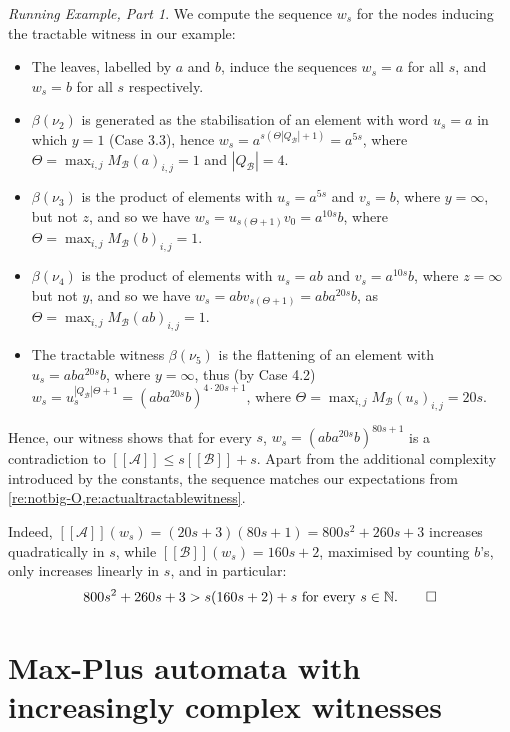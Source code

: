 \documentclass{lmcs}
\theoremstyle{remark}
\newcommand{\autA}{\mathcal{A}}
\newcommand{\autB}{\mathcal{B}}
\newcommand{\brfunc}[1]{[\![#1]\!]}
\newcommand{\funcA}{\brfunc{\autA}}
\newcommand{\funcB}{\brfunc{\autB}}
\theoremstyle{remark}
\newtheorem{runningexample/}{Running Example, Part}
\newenvironment{runningexample}
  {\renewcommand{\qedsymbol}{\color{darkgray}\ensuremath{\lrcorner}}%
   \pushQED{\qed}\begin{runningexample/}}
  {\popQED\end{runningexample/}}
\begin{document}
\begin{runningexample}
We compute the sequence $w_s$ for the nodes inducing the tractable witness in our example:
\begin{itemize}
\item The leaves, labelled by $a$ and $b$, induce the sequences $w_s = a$ for all $s$, and $w_s = b$ for all $s$ respectively.
\item $\beta(\nu_2)$ is generated as the stabilisation of an element with word $u_s = a$ in which $y = 1$ (Case 3.3), hence $w_s = a^{s(\Theta |Q_\autB| + 1)} = a^{5s}$, where $\Theta =\max_{i,j} M_\autB(a)_{i,j} = 1$ and $|Q_\autB| = 4$.
\item $\beta(\nu_3)$ is the product of elements with $u_s = a^{5s}$ and $v_s = b$, where $y= \infty$, but not $z$, and so we have $w_s = u_{s(\Theta+1)}v_0 = a^{10s}b $, where $\Theta  =\max_{i,j} M_\autB(b)_{i,j} = 1$.
\item $\beta(\nu_4)$ is the product of elements with $u_s = ab$ and $v_s = a^{10s}b$, where $z= \infty$ but not $y$, and so we have $w_s = ab v_{s(\Theta+1)}= ab a^{20s}b$, as $\Theta =\max_{i,j} M_\autB(ab)_{i,j} = 1$.
\item The tractable witness $\beta(\nu_5)$ is the flattening of an element with $u_s = aba^{20s}b$, where $y= \infty$, thus (by Case 4.2) $w_s = u_s^{|Q_\autB|\Theta + 1} = (aba^{20s}b)^{4\cdot 20s + 1} $, where $\Theta  =\max_{i,j} M_\autB(u_s)_{i,j} =  20s$.
\end{itemize}
Hence, our witness shows that for every $s$, $w_s=(aba^{20s}b)^{80s + 1}$ is a contradiction to $\funcA \le s \funcB + s$. Apart from the additional complexity introduced by the constants, the sequence matches our expectations from \cref{re:notbig-O,re:actualtractablewitness}.

Indeed, $\funcA(w_s) = (20s+3)(80s+1) = 800s^2 +260s+3$ increases quadratically in $s$, while $\funcB(w_s) = 160s + 2$, maximised by counting $b$'s, only increases linearly in $s$, and in particular:
\[
800s^2 +260s+3 > s(160s+2) + s \text{ for every }s \in\mathbb{N}.\qedhere
\]
\end{runningexample}

\section{Max-Plus automata with increasingly complex witnesses}
\label{sec:example}
\end{document}
